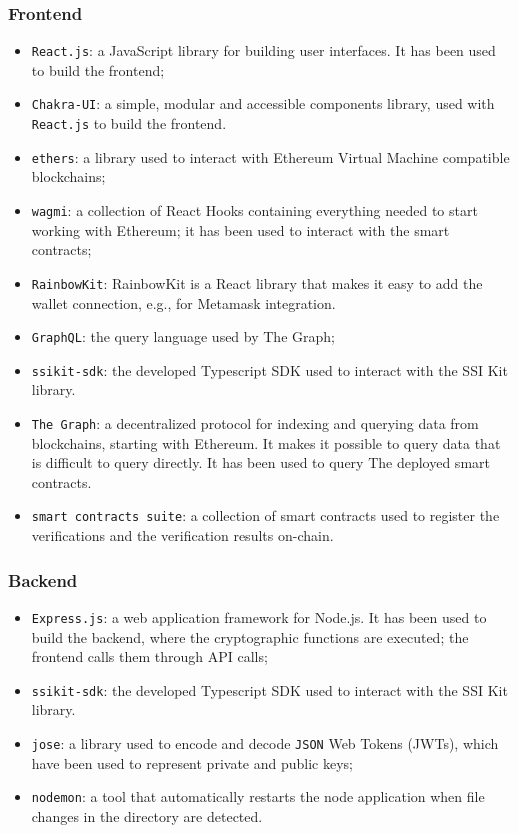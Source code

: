 \subsubsection{Frontend}
\begin{itemize}
    \setlength\itemsep{-0.1em}
    \item \texttt{React.js}: a JavaScript library for building user interfaces. It
    has been used to build the frontend;
    \item \texttt{Chakra-UI}: a simple, modular and accessible components library,
    used with \texttt{React.js} to build the frontend.
    \item \texttt{ethers}: a library used to interact with Ethereum Virtual
    Machine compatible blockchains;
    \item \texttt{wagmi}: a collection of React Hooks containing everything needed
    to start working with Ethereum; it has been used to interact with the smart
    contracts;
    \item \texttt{RainbowKit}: RainbowKit is a React library that makes it easy to 
    add the wallet connection, e.g., for Metamask integration.
    \item \texttt{GraphQL}: the query language used by The Graph;
    \item \texttt{ssikit-sdk}: the developed Typescript SDK used to interact with 
    the SSI Kit library.
    \item \texttt{The Graph}: a decentralized protocol for indexing and querying
    data from blockchains, starting with Ethereum. It makes it possible to query 
    data that is difficult to query directly. It has been used to query The
    deployed smart contracts.
    \item \texttt{smart contracts suite}: a collection of smart contracts used to
    register the verifications and the verification results on-chain.
\end{itemize}

\subsubsection{Backend}
\begin{itemize}
    \setlength\itemsep{-0.1em}
    \item \texttt{Express.js}: a web application framework for Node.js. It has been
    used to build the backend, where the cryptographic functions are executed; the frontend
    calls them through API calls;
    \item \texttt{ssikit-sdk}: the developed Typescript SDK used to interact with
    the SSI Kit library.
    \item \texttt{jose}: a library used to encode and decode \texttt{JSON} Web Tokens (JWTs),
    which have been used to represent private and public keys;
    \item \texttt{nodemon}: a tool that automatically restarts the node application
    when file changes in the directory are detected.
\end{itemize}

